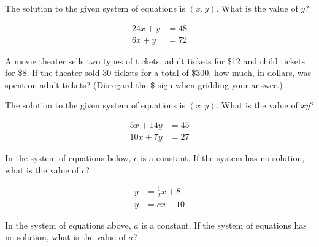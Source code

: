 \vspace{5em}
\noindent\markforreview

\vspace{1em}

The solution to the given system of equations is \( (x, y) \). What is the value of \( y \)?

\[
\begin{aligned}
24x + y &= 48 \\
6x + y &= 72
\end{aligned}
\]

\vspace{5em}
\noindent\markforreview

\vspace{1em}

A movie theater sells two types of tickets, adult tickets for \$12 and child tickets for \$8. If the theater sold 30 tickets for a total of \$300, how much, in dollars, was spent on adult tickets? (Disregard the \$ sign when gridding your answer.)

\newpage
\noindent\markforreview

\vspace{1em}

The solution to the given system of equations is \( (x, y) \). What is the value of \( xy \)?

\[
\begin{aligned}
5x + 14y &= 45 \\
10x + 7y &= 27
\end{aligned}
\]

\vspace{2em}

\noindent\markforreview

\vspace{1em}

In the system of equations below, \( c \) is a constant. If the system has no solution, what is the value of \( c \)?

\[
\begin{aligned}
y &= \frac{1}{2}x + 8 \\
y &= cx + 10
\end{aligned}
\]

\vspace{2em}

\noindent\markforreview

\vspace{1em}

In the system of equations above, \( a \) is a constant. If the system of equations has no solution, what is the value of \( a \)?

